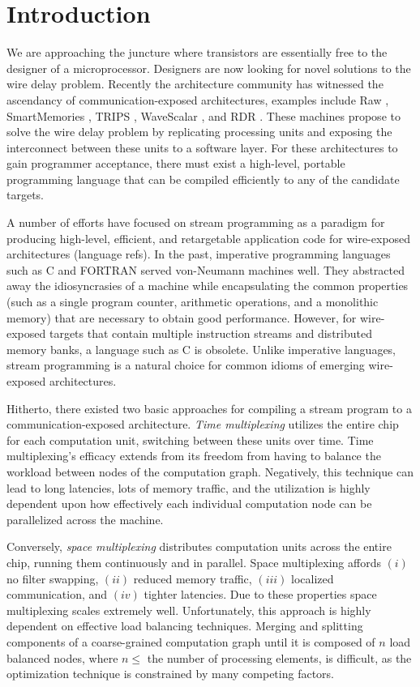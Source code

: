 \section{Introduction}

We are approaching the juncture where transistors are essentially free
to the designer of a microprocessor.  Designers are now looking for
novel solutions to the wire delay problem. Recently the architecture
community has witnessed the ascendancy of communication-exposed
architectures, examples include Raw
\cite{raw, raw_isca}, SmartMemories \cite{smartmemories}, TRIPS \cite{trips},
WaveScalar \cite{wavescalar}, and RDR \cite{rdr}.  These
machines propose to solve the wire delay problem by replicating
processing units and exposing the interconnect between these units to
a software layer.  For these architectures to gain programmer
acceptance, there must exist a high-level, portable programming
language that can be compiled efficiently to any of the candidate
targets.  


A number of efforts have focused on stream programming as a paradigm
for producing high-level, efficient, and retargetable application code
for wire-exposed architectures \cite{streamit-asplos} (language refs).
In the past, imperative programming languages such as C and FORTRAN
served von-Neumann machines well.  They abstracted away the
idiosyncrasies of a machine while encapsulating the common properties
(such as a single program counter, arithmetic operations, and a
monolithic memory) that are necessary to obtain good performance.
However, for wire-exposed targets that contain multiple instruction
streams and distributed memory banks, a language such as C is
obsolete.  Unlike imperative languages, stream programming is a
natural choice for common idioms of emerging wire-exposed
architectures.

Hitherto, there existed two basic approaches for compiling a stream
program to a communication-exposed architecture.  {\it Time
multiplexing} utilizes the entire chip for each computation unit,
switching between these units over time.  Time multiplexing's efficacy
extends from its freedom from having to balance the workload between
nodes of the computation graph.  Negatively, this technique can lead
to long latencies, lots of memory traffic, and the utilization is
highly dependent upon how effectively each individual computation node
can be parallelized across the machine.

Conversely, {\it space multiplexing} distributes computation units
across the entire chip, running them continuously and in parallel.
Space multiplexing affords $(i)$ no filter swapping, $(ii)$ reduced
memory traffic, $(iii)$ localized communication, and $(iv)$ tighter
latencies.  Due to these properties space multiplexing scales
extremely well.  Unfortunately, this approach is highly dependent on
effective load balancing techniques.  Merging and splitting components
of a coarse-grained computation graph until it is composed of $n$ load
balanced nodes, where $n \le$ the number of processing elements, is
difficult, as the optimization technique is constrained by many
competing factors.

